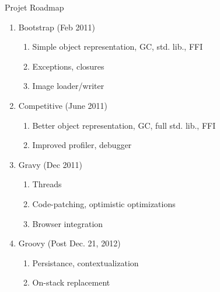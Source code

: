 \begin{frame}{Projet Roadmap}
    \begin{enumerate}[1.]
        \item Bootstrap (Feb 2011)
        \begin{enumerate}[1.]
            \item Simple object representation, GC, std. lib., FFI
            \item Exceptions, closures
            \item Image loader/writer
        \end{enumerate}

        \item Competitive (June 2011)
        \begin{enumerate}[1.]
            \item Better object representation, GC, full std. lib., FFI
            \item Improved profiler, debugger
        \end{enumerate}

        \item Gravy (Dec 2011)
        \begin{enumerate}[1.]
            \item Threads 
            \item Code-patching, optimistic optimizations
            \item Browser integration
        \end{enumerate}

        \item Groovy (Post Dec. 21, 2012)
        \begin{enumerate}[1.]
            \item Persistance, contextualization
            \item On-stack replacement
        \end{enumerate}
    \end{enumerate}
\end{frame}
